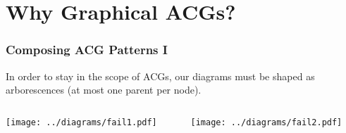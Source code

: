 \documentclass{beamer}
\begin{document}
\section{Why Graphical ACGs?}

\begin{frame}
  \frametitle{Composing ACG Patterns I}

  In order to stay in the scope of ACGs, our diagrams must be shaped as
  arborescences (at most one parent per node).

  \begin{columns}[c]
    \begin{column}{0.5\textwidth}
      \begin{center}
        \texttt{[image: ../diagrams/fail1.pdf]}
      \end{center}
    \end{column}
    \begin{column}{0.5\textwidth}
      \begin{center}
        \texttt{[image: ../diagrams/fail2.pdf]}
      \end{center}
    \end{column}
  \end{columns}
\end{frame}
\end{document}
